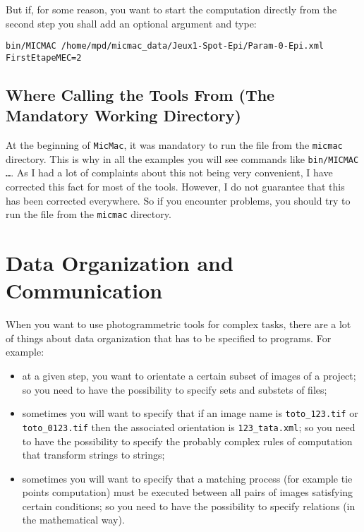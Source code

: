 But if, for some reason, you want to start the computation directly
from the second step you shall add an optional argument and type:

\begin{verbatim}
bin/MICMAC /home/mpd/micmac_data/Jeux1-Spot-Epi/Param-0-Epi.xml  FirstEtapeMEC=2
\end{verbatim}


\subsection{Where Calling the Tools From (The Mandatory Working Directory)}

At the beginning of {\tt MicMac}, it was mandatory to run the file from the
{\tt micmac} directory. This is why in all the examples you will see
commands like {\tt bin/MICMAC \dots}. As I had a lot of complaints
about this not being very convenient, I have corrected this fact for most
of the tools.  However, I do not guarantee that this has been corrected
everywhere. So if you encounter problems,  you should try to run the file
from the {\tt micmac} directory.




\section{Data Organization and Communication}

When you want to use photogrammetric tools for complex tasks, there are a lot
of things about data organization that has to be specified to programs.
For example:

\begin{itemize}
   \item  at  a given step, you want to orientate a certain subset of images of a
          project; so you need  to have the possibility to specify sets
          and substets of files;

   \item  sometimes you will want to specify that if an image name is
          {\tt toto\_123.tif} or  {\tt toto\_0123.tif}  then the associated orientation is
          {\tt 123\_tata.xml}; so you need to have the possibility to specify the probably complex
          rules of computation that transform strings to strings;

   \item  sometimes you will want to specify that a matching process (for example
          tie points computation) must be executed between all pairs of images satisfying
          certain conditions; so  you need to have the possibility to specify relations
          (in the mathematical way).
\end{itemize}
  
